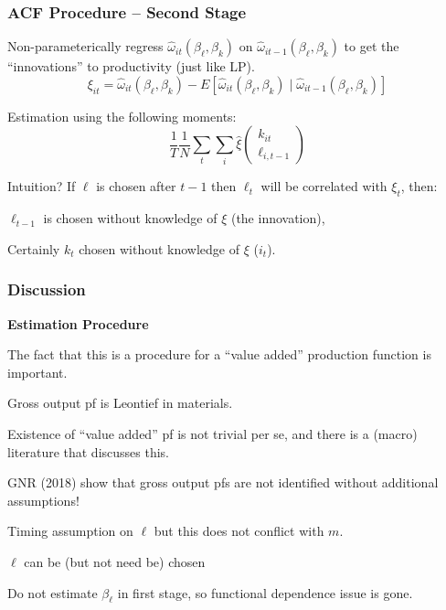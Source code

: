 \documentclass[11pt, aspectratio=169]{beamer}
\newenvironment{wideitemize}{\itemize\addtolength{\itemsep}{10pt}}{\enditemize}
\begin{document}
\begin{frame}[c]\frametitle{ACF Procedure -- Second Stage}
    

\begin{wideitemize}
	\item Non-parameterically regress $\hat{\omega}_{it}(\beta_{\ell},\beta_k)$ on $\hat{\omega}_{it-1}(\beta_{\ell},\beta_k)$ to get the ``innovations'' to productivity (just like LP). 
	$$\xi_{it} = \hat{\omega}_{it}(\beta_{\ell},\beta_k) - E[\hat{\omega}_{it}(\beta_{\ell},\beta_k) \mid \hat{\omega}_{it-1}(\beta_{\ell},\beta_k)]$$
	\item Estimation using the following moments:
	$$\frac{1}{T}\frac{1}{N}\sum_t\sum_i \hat{\xi} 
	\begin{pmatrix}
		k_{it}\\
		\ell_{i,t-1}
	\end{pmatrix}$$
	\item Intuition? If $\ell$ is chosen after $t-1$ then $\ell_t$ will be correlated with $\xi_t$, then:
	\begin{wideitemize}
		\item $\ell_{t-1}$ is chosen without knowledge of $\xi$ (the innovation),
		\item Certainly $k_{t}$ chosen without knowledge of $\xi$ ($i_{t}$).
	\end{wideitemize}
\end{wideitemize}

\end{frame}




\begin{frame}[c]\frametitle{Discussion}
    
\textbf{Estimation Procedure}    
\begin{wideitemize}
	\item The fact that this is a procedure for a ``value added'' production function is important. 
	\begin{wideitemize}
		\item Gross output pf is Leontief in materials.
		\item Existence of ``value added'' pf is not trivial per se, and there is a (macro) literature that discusses this.
		\item GNR (2018) show that gross output pfs are not identified without additional assumptions!
	\end{wideitemize}
	\item Timing assumption on $\ell$ but this does not conflict with $m$. 
	\begin{wideitemize}
		\item $\ell$ can be (but not need be) chosen
	\end{wideitemize}
	\item Do not estimate $\beta_{\ell}$ in first stage, so functional dependence issue is gone. 
\end{wideitemize}

\end{frame}
\end{document}
